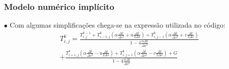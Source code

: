 \documentclass[xcolor=dvipsnames,10pt,aspectratio=169]{beamer}
\begin{document}
	\begin{frame}
		\frametitle{Modelo numérico implícito}
		$\bullet$ Com algumas simplificações chega-se na expressão utilizada no código:
		\begin{equation}
			\begin{split}
			T_{i,j}^{k} = \frac{T_{i,j}^{k-1} + T_{i -1, j}^{k} \left( \alpha \frac{\Delta t}{\Delta s^2} + u \frac{\Delta t}{2 \Delta s} \right) 	+ T_{i,j-1}^{k} \left( \alpha \frac{\Delta t}{\Delta s^2} + v \frac{\Delta t}{2 \Delta s} \right)}{ 1 - 4 \frac{\alpha \Delta t}{\Delta s ^2}} \\
			+ \frac{  T_{i+1,j}^{k} \left( \alpha \frac{\Delta t}{ \Delta s^2} - u \frac{\Delta t}{2 \Delta s}\right)
			+  T_{i,j+1}^{k} \left( \alpha \frac{\Delta t}{\Delta s^2} - v \frac{\Delta t}{2 \Delta s}\right) + G}{ 1 - 4 \frac{\alpha \Delta t}{\Delta s ^2}}
			\end{split}
		\end{equation}
	\end{frame}
\end{document}
